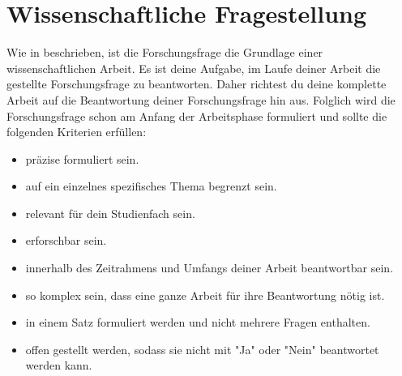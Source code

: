 

\chapter{Wissenschaftliche Fragestellung}\label{cha:researchQuestion}

Wie in \textcite{solis2023} beschrieben, ist die Forschungsfrage  die Grundlage einer wissenschaftlichen Arbeit. Es ist deine Aufgabe, im Laufe deiner Arbeit die gestellte Forschungsfrage zu beantworten. Daher richtest du deine komplette Arbeit auf die Beantwortung deiner Forschungsfrage hin aus. Folglich wird die Forschungsfrage schon am Anfang der Arbeitsphase formuliert und sollte die folgenden Kriterien erfüllen:

\begin{itemize}
    \item präzise formuliert sein.
    \item auf ein einzelnes spezifisches Thema begrenzt sein.
    \item relevant für dein Studienfach sein.
    \item erforschbar sein.
    \item innerhalb des Zeitrahmens und Umfangs deiner Arbeit beantwortbar sein.
    \item so komplex sein, dass eine ganze Arbeit für ihre Beantwortung nötig ist.
    \item in einem Satz formuliert werden und nicht mehrere Fragen enthalten.
    \item offen gestellt werden, sodass sie nicht mit "Ja" oder "Nein" beantwortet werden kann.
\end{itemize}

